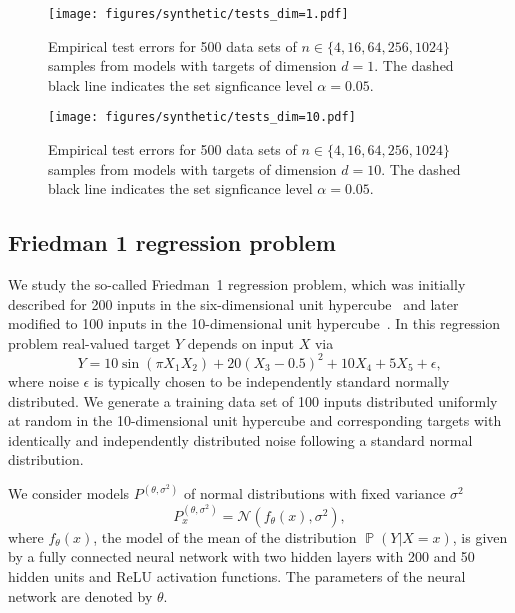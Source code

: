 \documentclass{article}
\DeclareMathOperator{\Prob}{\mathbb{P}}
\begin{document}
\begin{figure}[hpt]
    \begin{center}
        \texttt{[image: figures/synthetic/tests\_dim=1.pdf]}
        \caption{Empirical test errors for 500 data sets of $n \in \{4, 16, 64, 256, 1024\}$
        samples from models with targets of dimension $d = 1$. The dashed black line
        indicates the set signficance level $\alpha = 0.05$.}
        \label{fig:synthetic_tests_1}
    \end{center}
\end{figure}

\begin{figure}[hpt]
    \begin{center}
        \texttt{[image: figures/synthetic/tests\_dim=10.pdf]}
        \caption{Empirical test errors for 500 data sets of $n \in \{4, 16, 64, 256, 1024\}$
        samples from models with targets of dimension $d = 10$. The dashed black line
        indicates the set signficance level $\alpha = 0.05$.}
        \label{fig:synthetic_tests_10}
    \end{center}
\end{figure}

\clearpage

\subsection{Friedman 1 regression problem}

We study the so-called Friedman~1 regression problem, which was initially
described for 200 inputs in the six-dimensional unit
hypercube~\citep{Friedman1979,Friedman1983} and later modified to 100 inputs in
the 10-dimensional unit hypercube~\citep{Friedman1991}. In this regression
problem real-valued target $Y$ depends on input $X$ via
\begin{equation*}
    Y = 10 \sin{(\pi X_1 X_2)} + 20{(X_3 - 0.5)}^2 + 10 X_4 + 5 X_5 + \epsilon,
\end{equation*}
where noise $\epsilon$ is typically chosen to be independently standard
normally distributed. We generate a training data set of 100 inputs distributed
uniformly at random in the 10-dimensional unit hypercube and corresponding targets
with identically and independently distributed noise following a standard normal
distribution.

We consider models $P^{(\theta,\sigma^2)}$ of normal distributions with fixed variance
$\sigma^2$
\begin{equation*}
    P^{(\theta,\sigma^2)}_x = \mathcal{N}(f_{\theta}(x), \sigma^2),
\end{equation*}
where $f_{\theta}(x)$, the model of the mean of the distribution $\Prob(Y|X = x)$,
is given by a fully connected neural network with two hidden layers with 200 and 50
hidden units and ReLU activation functions. The parameters of the neural network
are denoted by $\theta$.
\end{document}
